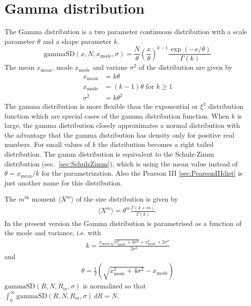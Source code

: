 \clearpage
\section{Gamma distribution}

The Gamma distribution is a two parameter continuous distribution with
a scale parameter $\theta$ and a shape parameter $k$.
\begin{equation}
\text{gammaSD}(x,N,x_\text{mode},\sigma) =  \frac{N}{\theta}
\left(\frac{x}{\theta}\right)^{k-1}
\frac{\exp(-x/\theta)}{\Gamma(k)} \label{GammaSDEq}
\end{equation}
The mean $x_\text{mean}$, mode $x_\text{mode}$ and variane $\sigma^2$
of the distribution are given by
\begin{align}
x_\text{mean}   &= k\theta \\
x_\text{mode}   &= (k-1)\theta \text{ for } k\geq 1 \\
\sigma^2        &= k\theta^2
\end{align}
The gamma distribution is more flexible than the exponential or $\xi^2$ distribution
function which are special cases of the gamma distribution function.
When $k$ is large, the gamma distribution closely approximates a normal distribution
with the advantage that the gamma distribution has density only for positive real
numbers. For small values of $k$ the distribution becomes a right tailed distribution.
The gamm distribution is equivalent to the Schulz-Zimm distribution (sec.\ \ref{sec:SchulzZimm}), which is using the mean value instead of $\theta=x_\mathrm{mean}/k$ for the parametrization. Also the Pearson III \ref{sec:PearsonIIIdist} is just another name for this distribution.

The $m^\text{th}$ moment $\langle X^m\rangle$ of the size distribution is given by
\begin{align}
\langle X^m\rangle = \theta^m \frac{\Gamma(k+m)}{\Gamma(k)} .
\end{align}
In the present version the Gamma distribution is parametrised as a function
of the mode and variance, i.e.
with
\begin{align}
k=\frac{x_\text{mode} \sqrt{x_\text{mode}^2+4
   \sigma^2}+x_\text{mode}^2+2 \sigma ^2}{2 \sigma^2}
\end{align}
 and
\begin{align}
 \theta = \frac{1}{2}
   \left(\sqrt{x_\text{mode}^2+4 \sigma ^2}-x_\text{mode}\right)
\end{align}
$\text{gammaSD}(R,N,R_m,\sigma)$ is normalized so that
$\int_0^\infty\! \text{gammaSD}(R,N,R_m,\sigma)\,dR = N$.

